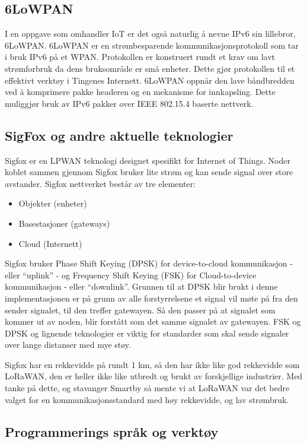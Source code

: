 \documentclass{article}
\begin{document}
\subsection{6LoWPAN}
I en oppgave som omhandler IoT er det også naturlig å nevne IPv6 sin lillebror, 6LoWPAN. 6LoWPAN er en strømbesparende kommunikasjonsprotokoll som tar i bruk IPv6 på et WPAN. Protokollen er konstruert rundt et krav om lavt strømforbruk da dens bruksområde er små enheter. Dette gjør protokollen til et effektivt verktøy i Tingenes Internett. 6LoWPAN oppnår den lave båndbredden ved å komprimere pakke headeren og en mekanisme for innkapsling. Dette muliggjør bruk av IPv6 pakker over IEEE 802.15.4 baserte nettverk.

\subsection{SigFox og andre aktuelle teknologier}
Sigfox er en LPWAN teknologi designet spesifikt for Internet of Things. Noder koblet sammen gjennom Sigfox bruker lite strøm og kan sende signal over store avstander. Sigfox nettverket består av tre elementer:
\\
\begin{itemize}
	\item Objekter (enheter)
	\item Basestasjoner (gateways)
	\item Cloud (Internett)
\end{itemize}
Sigfox bruker Phase Shift Keying (DPSK) for device-to-cloud kommunikasjon - eller “uplink” - og Frequency Shift Keying (FSK) for Cloud-to-device kommunikasjon - eller “downlink”. Grunnen til at DPSK blir brukt i denne implementasjonen er på grunn av alle forstyrrelsene et signal vil møte på fra den sender signalet, til den treffer gatewayen. Så den passer på at signalet som kommer ut av noden, blir forstått som det samme signalet av gatewayen.
FSK og DPSK og lignende teknologier er viktig for standarder som skal sende signaler over lange distanser med mye støy.

Sigfox har en rekkevidde på rundt 1 km, så den har ikke like god rekkevidde som LoRaWAN, den er heller ikke like utbredt og brukt av forskjellige industrier. Med tanke på dette, og stavanger Smartby så mente vi at LoRaWAN var det bedre valget for en kommunikasjonsstandard med høy rekkevidde, og lav strømbruk.


\subsection{Programmerings språk og verktøy}
\end{document}
